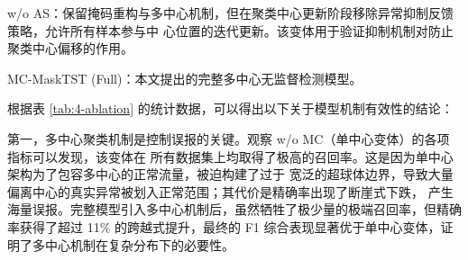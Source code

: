 w/o AS：保留掩码重构与多中心机制，但在聚类中心更新阶段移除异常抑制反馈策略，允许所有样本参与中
心位置的迭代更新。该变体用于验证抑制机制对防止聚类中心偏移的作用。

MC-MaskTST (Full)：本文提出的完整多中心无监督检测模型。

\begin{table}[htbp]
    \centering
    \caption{MC-MaskTST 模型各组件消融实验性能对比（\%）}
    \label{tab:4-ablation}
\end{table}

根据表 \ref{tab:4-ablation} 的统计数据，可以得出以下关于模型机制有效性的结论：

第一，多中心聚类机制是控制误报的关键。观察 w/o MC（单中心变体）的各项指标可以发现，该变体在
所有数据集上均取得了极高的召回率。这是因为单中心架构为了包容多中心的正常流量，被迫构建了过于
宽泛的超球体边界，导致大量偏离中心的真实异常被划入正常范围；其代价是精确率出现了断崖式下跌，
产生海量误报。完整模型引入多中心机制后，虽然牺牲了极少量的极端召回率，但精确率获得了超过 11\% 
的跨越式提升，最终的 F1 综合表现显著优于单中心变体，证明了多中心机制在复杂分布下的必要性。


